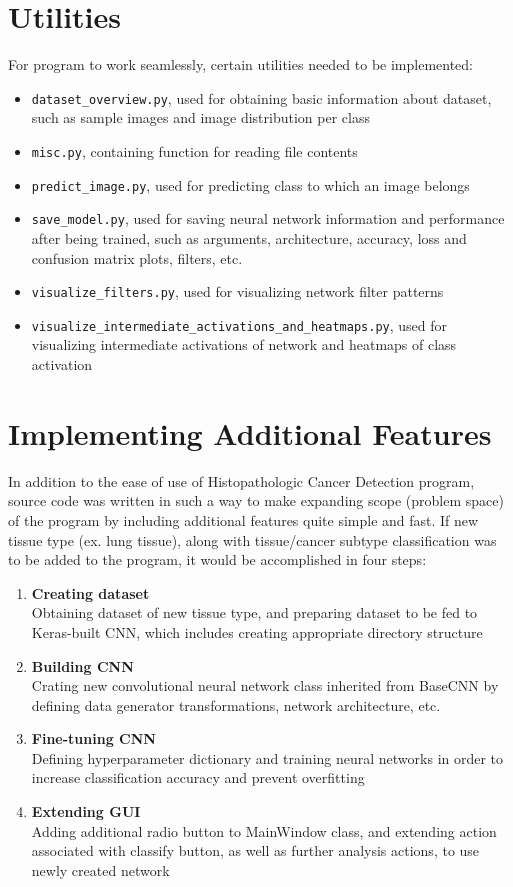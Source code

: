 \section{Utilities}

For program to work seamlessly, certain utilities needed to be implemented:
\begin{itemize}
	\itemsep 0em
	\item \texttt{dataset\_overview.py}, used for obtaining basic information about dataset, such as sample images and image distribution per class
	\item \texttt{misc.py}, containing function for reading file contents 
	\item \texttt{predict\_image.py}, used for predicting class to which an image belongs
	\item \texttt{save\_model.py}, used for saving neural network information and performance after being trained, such as arguments, architecture, accuracy, loss and confusion matrix plots, filters, etc.  
	\item \texttt{visualize\_filters.py}, used for visualizing network filter patterns
	\item \texttt{visualize\_intermediate\_activations\_and\_heatmaps.py}, used for visualizing intermediate activations of network and heatmaps of class activation
\end{itemize}

\section{Implementing Additional Features}

In addition to the ease of use of Histopathologic Cancer Detection program, source code was written in such a way to make expanding scope (problem space) of the program by including additional features quite simple and fast. If new tissue type (ex. lung tissue), along with tissue/cancer subtype classification was to be added to the program, it would be accomplished in four steps:
\begin{enumerate}
	\itemsep 0em
	\item \textbf{Creating dataset} \\
	Obtaining dataset of new tissue type, and preparing dataset to be fed to Keras-built CNN, which includes creating appropriate directory structure
	\item \textbf{Building CNN} \\
	Crating new convolutional neural network class inherited from BaseCNN by defining data generator transformations, network architecture, etc.
	\item \textbf{Fine-tuning CNN} \\
	Defining hyperparameter dictionary and training neural networks in order to increase classification accuracy and prevent overfitting
	\item \textbf{Extending GUI} \\
	Adding additional radio button to MainWindow class, and extending action associated with classify button, as well as further analysis actions, to use newly created network
\end{enumerate}

